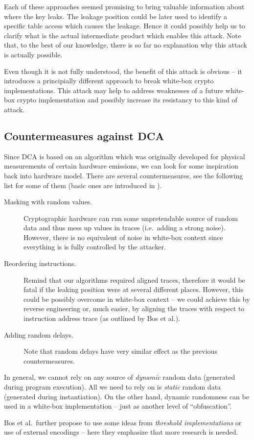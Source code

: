 Each of these approaches seemed promising to bring valuable information about where the key leaks. The leakage position could be later used to identify a specific table access which causes the leakage. Hence it could possibly help us to clarify what is the actual intermediate product which enables this attack. Note that, to the best of our knowledge, there is so far no explanation why this attack is actually possible.

Even though it is not fully understood, the benefit of this attack is obvious -- it introduces a principially different approach to break white-box crypto implementations. This attack may help to address weaknesses of a future white-box crypto implementation and possibly increase its resistancy to this kind of attack.



\subsection{Countermeasures against DCA}

Since DCA is based on an algorithm which was originally developed for physical measurements of certain hardware emissions, we can look for some inspiration back into hardware model. There are several countermeasures, see the following list for some of them (basic ones are introduced in \cite{chari1999towards,goubin1999des}).
\begin{description}
	\item[Masking with random values.] Cryptographic hardware can run some unpretendable source of random data and thus mess up values in traces (i.e.\ adding a strong noise). However, there is no equivalent of noise in white-box context since everything is is fully controlled by the attacker.
	\item[Reordering instructions.] Remind that our algorithms required aligned traces, therefore it would be fatal if the leaking position were at several different places. However, this could be possibly overcome in white-box context -- we could achieve this by reverse engineering or, much easier, by aligning the traces with respect to instruction address trace (as outlined by Bos et al.).
	\item[Adding random delays.] Note that random delays have very similar effect as the previous countermeasures.
\end{description}
In general, we cannot rely on any source of {\em dynamic} random data (generated during program execution). All we need to rely on is {\em static} random data (generated during instantiation). On the other hand, dynamic randomness can be used in a white-box implementation -- just as another level of ``obfuscation''.

Bos et al.\ further propose to use some ideas from {\em threshold implementations} \cite{nikova2006threshold} or use of external encodings -- here they emphasize that more research is needed.
